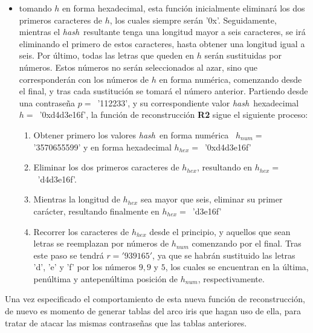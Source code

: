 \documentclass[12pt,spanish,listoffigures,listoftables,listofalgorithms]{tfgetsinf}
\newcommand{\hash}{\textit{hash}}
\begin{document}
\begin{itemize}

	\item tomando $h$ en forma hexadecimal, esta función inicialmente eliminará los dos primeros caracteres de $h$, los cuales siempre serán '0x'. Seguidamente, mientras el \hash~resultante tenga una longitud mayor a seis caracteres, se irá eliminando el primero de estos caracteres, hasta obtener una longitud igual a seis. Por último, todas las letras que queden en $h$ serán sustituidas por números. Estos números no serán seleccionados al azar, sino que corresponderán con los números de $h$ en forma numérica, comenzando desde el final, y tras cada sustitución se tomará el número anterior. Partiendo desde una contraseña $p =$~'112233', y su correspondiente valor \hash~hexadecimal $h =$~'0xd4d3e16f', la función de reconstrucción \textbf{R2} sigue el siguiente proceso:

		\begin{enumerate}
				
			\item Obtener primero los valores \hash~en forma numérica ~$h_{num} =$'3570655599' y en forma hexadecimal $h_{hex} =$~'0xd4d3e16f'

			\item Eliminar los dos primeros caracteres de $h_{hex}$, resultando en $h_{hex} =$~'d4d3e16f'.
		
			\item Mientras la longitud de $h_{hex}$ sea mayor que seis, eliminar su primer carácter, resultando finalmente en $h_{hex} =$~'d3e16f'
		
			\item Recorrer los caracteres de $h_{hex}$ desde el principio, y aquellos que sean letras se reemplazan por números de $h_{num}$ comenzando por el final. Tras este paso se tendrá $r = '939165'$, ya que se habrán sustituido las letras 'd', 'e' y 'f' por los números $9, 9$ y $5$, los cuales se encuentran en la última, penúltima y antepenúltima posición de $h_{num}$, respectivamente.

		\end{enumerate}

\end{itemize}

Una vez especificado el comportamiento de esta nueva función de reconstrucción, de nuevo es momento de generar tablas del arco iris que hagan uso de ella, para tratar de atacar las mismas contraseñas que las tablas anteriores.
\end{document}
